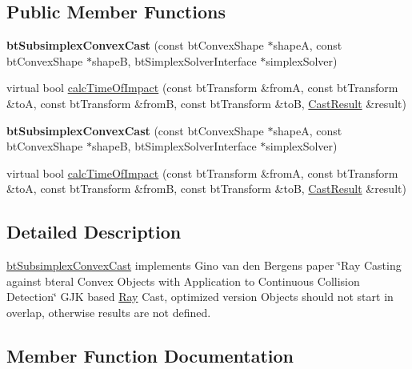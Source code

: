 \subsection*{Public Member Functions}
\begin{DoxyCompactItemize}
\item 
\mbox{\label{classbtSubsimplexConvexCast_a30fb126456a82b5fe625da26c6a28900}} 
{\bfseries bt\+Subsimplex\+Convex\+Cast} (const bt\+Convex\+Shape $\ast$shapeA, const bt\+Convex\+Shape $\ast$shapeB, bt\+Simplex\+Solver\+Interface $\ast$simplex\+Solver)
\item 
virtual bool \hyperlink{classbtSubsimplexConvexCast_a93202199b82c9d2f3074617f8db72e17}{calc\+Time\+Of\+Impact} (const bt\+Transform \&fromA, const bt\+Transform \&toA, const bt\+Transform \&fromB, const bt\+Transform \&toB, \hyperlink{structbtConvexCast_1_1CastResult}{Cast\+Result} \&result)
\item 
\mbox{\label{classbtSubsimplexConvexCast_a30fb126456a82b5fe625da26c6a28900}} 
{\bfseries bt\+Subsimplex\+Convex\+Cast} (const bt\+Convex\+Shape $\ast$shapeA, const bt\+Convex\+Shape $\ast$shapeB, bt\+Simplex\+Solver\+Interface $\ast$simplex\+Solver)
\item 
virtual bool \hyperlink{classbtSubsimplexConvexCast_ab5cfc6671de6ba064cd85301eb7b23ce}{calc\+Time\+Of\+Impact} (const bt\+Transform \&fromA, const bt\+Transform \&toA, const bt\+Transform \&fromB, const bt\+Transform \&toB, \hyperlink{structbtConvexCast_1_1CastResult}{Cast\+Result} \&result)
\end{DoxyCompactItemize}


\subsection{Detailed Description}
\hyperlink{classbtSubsimplexConvexCast}{bt\+Subsimplex\+Convex\+Cast} implements Gino van den Bergens\textquotesingle{} paper \char`\"{}\+Ray Casting against bteral Convex Objects with Application to Continuous Collision Detection\char`\"{} G\+JK based \hyperlink{classRay}{Ray} Cast, optimized version Objects should not start in overlap, otherwise results are not defined. 

\subsection{Member Function Documentation}
\mbox{\label{classbtSubsimplexConvexCast_a93202199b82c9d2f3074617f8db72e17}} 
